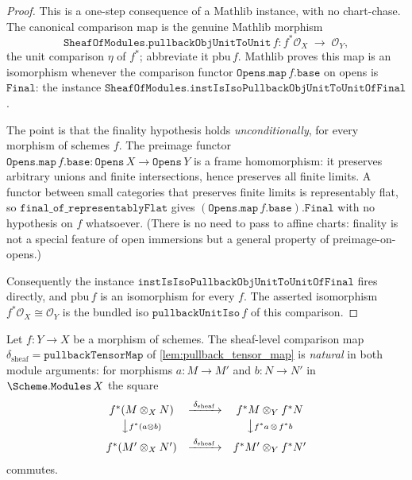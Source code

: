 \begin{proof}
  \leanok
  This is a one-step consequence of a Mathlib instance, with no chart-chase. The
  canonical comparison map is the genuine Mathlib morphism
  \[
    \mathtt{SheafOfModules.pullbackObjUnitToUnit}\,f :
      f^*\mathcal{O}_X \;\longrightarrow\; \mathcal{O}_Y,
  \]
  the unit comparison \(\eta\) of \(f^*\); abbreviate it \(\mathrm{pbu}\,f\). Mathlib
  proves this map is an isomorphism whenever the comparison functor
  \(\mathtt{Opens.map}\,f.\mathtt{base}\) on opens is \(\mathtt{Final}\): the instance
  \(\mathtt{SheafOfModules.instIsIsoPullbackObjUnitToUnitOfFinal}\).

  The point is that the finality hypothesis holds \emph{unconditionally}, for every
  morphism of schemes \(f\). The preimage functor \(\mathtt{Opens.map}\,f.\mathtt{base}
  : \mathtt{Opens}\,X \to \mathtt{Opens}\,Y\) is a frame homomorphism: it preserves
  arbitrary unions and finite intersections, hence preserves all finite limits. A
  functor between small categories that preserves finite limits is representably flat,
  so \(\mathtt{final\_of\_representablyFlat}\) gives \((\mathtt{Opens.map}\,f.\mathtt{base}).\mathtt{Final}\)
  with no hypothesis on \(f\) whatsoever. (There is no need to pass to affine charts:
  finality is not a special feature of open immersions but a general property of
  preimage-on-opens.)

  Consequently the instance \(\mathtt{instIsIsoPullbackObjUnitToUnitOfFinal}\) fires
  directly, and \(\mathrm{pbu}\,f\) is an isomorphism for every \(f\). The asserted
  isomorphism \(f^*\mathcal{O}_X \cong \mathcal{O}_Y\) is the bundled iso
  \(\mathtt{pullbackUnitIso}\,f\) of this comparison.
\end{proof}

\begin{lemma}


  \label{lem:pullback_tensor_map_natural}
  Let \(f : Y \to X\) be a morphism of schemes. The sheaf-level comparison map
  \(\delta_{\mathrm{sheaf}} = \mathtt{pullbackTensorMap}\) of
  \cref{lem:pullback_tensor_map} is \emph{natural} in both module arguments: for
  morphisms \(a : M \to M'\) and \(b : N \to N'\) in \(\Scheme.\mathtt{Modules}\,X\)
  the square
  \[
    \begin{array}{ccc}
      f^*(M \otimes_X N)
        & \xrightarrow{\;\delta_{\mathrm{sheaf}}\;}
        & f^*M \otimes_Y f^*N \\[2pt]
      \big\downarrow{\scriptstyle f^*(a \otimes b)}
        & & \big\downarrow{\scriptstyle f^*a \,\otimes\, f^*b} \\[4pt]
      f^*(M' \otimes_X N')
        & \xrightarrow{\;\delta_{\mathrm{sheaf}}\;}
        & f^*M' \otimes_Y f^*N'
    \end{array}
  \]
  commutes.
\end{lemma}

